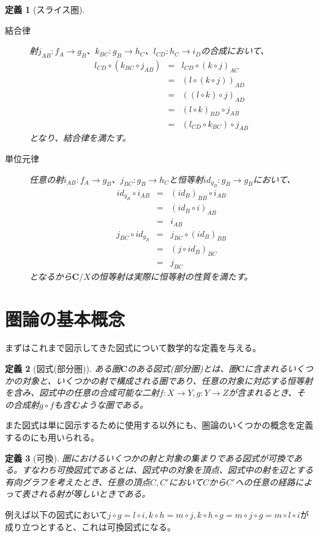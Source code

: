 \documentclass[dvipdfmx]{jsarticle}
\newcommand{\cat}[1]{\boldsymbol{#1}}
\newcommand{\arrow}{\rightarrow}
\newcommand{\mor}[3]{#1:#2\arrow #3}
\newtheorem{define}{定義}[section]
\begin{document}
\begin{define}[スライス圏]
\begin{description}
			\item[結合律] 射$\mor{j_{AB}}{f_A}{g_B}$、$\mor{k_{BC}}{g_B}{h_C}$、$\mor{l_{CD}}{h_C}{i_D}$の合成において、
			\begin{eqnarray*}
				l_{CD}\circ (k_{BC}\circ j_{AB})&=&l_{CD}\circ(k\circ j)_{AC} \\
				&=&(l\circ(k\circ j))_{AD} \\
				&=&((l\circ k)\circ j)_{AD} \\
				&=&(l\circ k)_{BD}\circ j_{AB} \\
				&=&(l_{CD}\circ k_{BC})\circ j_{AB}
			\end{eqnarray*}
			となり、結合律を満たす。
			\item[単位元律] 任意の射$\mor{i_{AB}}{f_A}{g_B}$、$\mor{j_{BC}}{g_B}{h_C}$と恒等射$\mor{id_{g_B}}{g_B}{g_B}$において、
			\begin{eqnarray*}
				id_{g_B}\circ i_{AB}&=&(id_B)_{BB}\circ i_{AB}\\
				&=&(id_B\circ i)_{AB}\\
				&=&i_{AB}
			\end{eqnarray*}
			\begin{eqnarray*}
				j_{BC}\circ id_{g_B}&=&j_{BC}\circ (id_B)_{BB}\\
				&=&(j\circ id_B)_{BC}\\
				&=&j_{BC}
			\end{eqnarray*}
			となるから$\cat{C}/X$の恒等射は実際に恒等射の性質を満たす。
		\end{description}
	\end{define}

	\section{圏論の基本概念}
	まずはこれまで図示してきた図式について数学的な定義を与える。
	\begin{define}[図式(部分圏)]
		ある圏$\cat{C}$のある図式(部分圏)とは、圏$\cat{C}$に含まれるいくつかの対象と、いくつかの射で構成される圏であり、任意の対象に対応する恒等射を含み、図式中の任意の合成可能な二射$\mor{f}{X}{Y},\mor{g}{Y}{Z}$が含まれるとき、その合成射$g\circ f$も含むような圏である。
	\end{define}
	また図式は単に図示するために使用する以外にも、圏論のいくつかの概念を定義するのにも用いられる。
	\begin{define}[可換]
		圏におけるいくつかの射と対象の集まりである図式が可換である。すなわち可換図式であるとは、図式中の対象を頂点、図式中の射を辺とする有向グラフを考えたとき、任意の頂点$C,C'$において$C$から$C'$への任意の経路によって表される射が等しいときである。
	\end{define}
	例えば以下の図式において$j\circ g=l\circ i,k\circ h=m\circ j,k\circ h\circ g=m\circ j\circ g = m\circ l\circ i$が成り立つとすると、これは可換図式になる。
\end{document}
